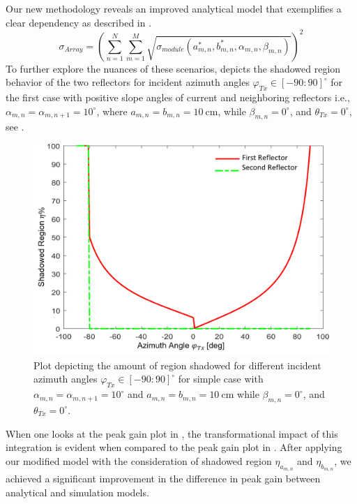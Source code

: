 Our new methodology reveals an improved analytical model that exemplifies a clear dependency as described in  .
\begin{equation}\label{Eq:RCS_SUMMATION_SR}
	\sigma_{Array}= \left(\sum_{n=1}^{N}\sum_{m=1}^{M} \sqrt{\sigma_{module} \left( a_{m,n}^*, b_{m,n}^*, \alpha_{m,n}, \beta_{m,n} \right) } \right)^2
\end{equation}
To further explore the nuances of these scenarios,  depicts the shadowed region behavior of the two reflectors for incident azimuth angles $\varphi_{Tx} \in [-90:90]^\circ$ for the first case with positive slope angles of current and neighboring reflectors i.e., $\alpha_{m,n}=\alpha_{m,n+1}=\num{10}^\circ$, where $a_{m,n}=b_{m,n}=\SI{10}{\centi\meter}$, while $\beta_{m,n}=0^\circ$, and $\theta_{Tx}=0^\circ$, see . 

\begin{figure}[tb]
	\centering
	\includegraphics[width=0.7\linewidth]{images/Section 3 Images/ShadowRegion3}
	\caption{Plot depicting the amount of region shadowed for different incident azimuth angles $\varphi_{Tx} \in [-90:90]^\circ$ for simple case with  $\alpha_{m,n}=\alpha_{m,n+1}=\num{10}^\circ$ and $a_{m,n}=b_{m,n}=\SI{10}{\centi\meter}$ while $\beta_{m,n}=0^\circ$, and $\theta_{Tx}=0^\circ$. }
	\label{fig:Shadow region2}
\end{figure}
When one looks at the peak gain plot in , the transformational impact of this integration is evident when compared to the peak gain plot in . After applying our modified model with the consideration of shadowed region $\eta_{a_{m,n}}$ and $\eta_{b_{m,n}}$, we achieved a significant improvement in the difference in peak gain between analytical and simulation models.

